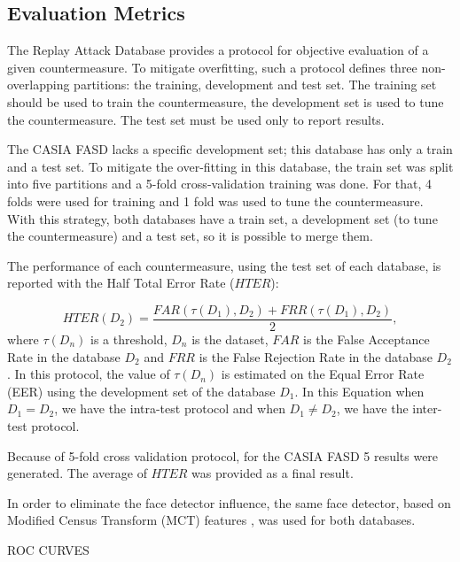 \subsection{Evaluation Metrics}

The Replay Attack Database provides a protocol for objective evaluation of a given countermeasure. To mitigate overfitting, such a protocol defines three non-overlapping partitions: the training, development and test set. The training set should be used to train the countermeasure, the development set is used to tune the countermeasure. The test set must be used only to report results. 

The CASIA FASD lacks a specific development set; this database has only a train and a test set. To mitigate the over-fitting in this database, the train set was split into five partitions and a 5-fold cross-validation training was done. For that, 4 folds were used for training and 1 fold was used to tune the countermeasure. With this strategy, both databases have a train set, a development set (to tune the countermeasure) and a test set, so it is possible to merge them.

The performance of each countermeasure, using the test set of each database, is reported with the Half Total Error Rate ($HTER$): 

\begin{equation}
\label{eq:HTER}
HTER(D_2)=\frac{FAR(\tau(D_1),D_2)+ FRR(\tau(D_1),D_2)} {2} ,
\end{equation}
where $\tau(D_n)$ is a threshold, $D_n$ is the dataset, $FAR$ is the False Acceptance Rate in the database $D_2$ and $FRR$ is the False Rejection Rate in the database $D_2$. In this protocol, the value of $\tau(D_n)$ is estimated on the Equal Error Rate (EER) using the development set of the database $D_1$. In this Equation when $D_1 = D_2$, we have the intra-test protocol and when $D_1 \neq D_2$, we have the inter-test protocol.

Because of 5-fold cross validation protocol, for the CASIA FASD 5 results were generated. The average of $HTER$ was provided as a final result.

In order to eliminate the face detector influence, the same face detector, based on Modified Census Transform (MCT) features \cite{froba2004face}, was used for both databases.

ROC CURVES


